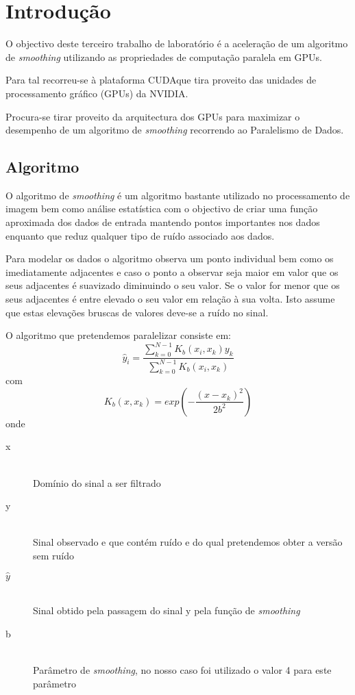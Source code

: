 \chapter{Introdução}
O objectivo deste terceiro trabalho de laboratório é a aceleração de um algoritmo de \textit{smoothing} utilizando as propriedades de computação paralela em GPUs.

Para tal recorreu-se à plataforma CUDA\texttrademark  que tira proveito das unidades de processamento gráfico (GPUs) da NVIDIA\texttrademark.

Procura-se tirar proveito da arquitectura dos GPUs para maximizar o desempenho de um algoritmo de \textit{smoothing} recorrendo ao Paralelismo de Dados.

\section{Algoritmo}

O algoritmo de \textit{smoothing} é um algoritmo bastante utilizado no processamento de imagem bem como análise estatística com o objectivo de criar uma função aproximada dos dados de entrada mantendo pontos importantes nos dados enquanto que reduz qualquer tipo de ruído associado aos dados. 

Para modelar os dados o algoritmo observa um ponto individual bem como os imediatamente adjacentes e caso o ponto a observar seja maior em valor que os seus adjacentes é suavizado diminuindo o seu valor. Se o valor for menor que os seus adjacentes é entre elevado o seu valor em relação à sua volta. Isto assume que estas elevações bruscas de valores deve-se a ruído no sinal.

O algoritmo que pretendemos paralelizar consiste em:
\[ \hat{y}_i=\frac{\sum_{k=0}^{N-1} K_{b}(x_i,x_k)y_k}{\sum_{k=0}^{N-1} K_{b}(x_i,x_k)} \]
com
\[ K_b(x,x_k)=exp\left ( -\frac{\left ( x-x_k \right )^2}{2b^2} \right ) \]
onde
\begin{description}
	\item[x] \hfill \\
	Domínio do sinal a ser filtrado
	\item[y] \hfill \\
	Sinal observado e que contém ruído e do qual pretendemos obter a versão sem ruído
	\item[$\hat{y}$] \hfill \\
	Sinal obtido pela passagem do sinal y pela função de \textit{smoothing}
	\item[b] \hfill \\
	Parâmetro de \textit{smoothing}, no nosso caso foi utilizado o valor 4 para este parâmetro
\end{description}